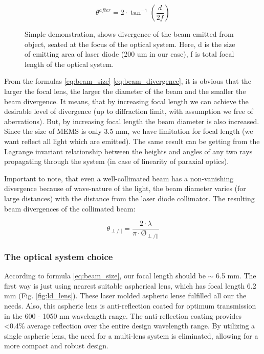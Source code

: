 \begin{figure}[H]
\begin{minipage}[h]{0.52\linewidth}
\end{minipage}
\hfill
\begin{minipage}[h]{0.45\linewidth}
\begin{equation}\label{eq:beam_divergence}
\theta^{after} = 2 \cdot \tan^{-1}{(\frac{d}{2f})}
\end{equation}
\end{minipage}
\caption{
Simple demonstration, shows divergence of the beam emitted from object, seated at the focus of the optical system. Here, d is the size of emitting area of laser diode (200 um in our case), f is total focal length of the optical system.
}
\label{fig:lens}
\end{figure}





From the formulas \ref{eq:beam_size} \ref{eq:beam_divergence}, it is obvious that the larger the focal lens, the larger the diameter of the beam and the smaller the beam divergence. It means, that by increasing focal length we can achieve the desirable level of divergence (up to diffraction limit, with assumption we free of aberrations). But, by increasing focal length the beam diameter is also increased.
Since the size of MEMS is only 3.5 mm, we have limitation for focal length (we want reflect all light which are emitted).
The same result can be getting from the Lagrange invariant relationship between the heights and angles of any two rays propagating through the system (in case of linearity of paraxial optics).

Important to note, that even a well-collimated beam has a non-vanishing divergence because of wave-nature of the light, the beam diameter varies (for large distances) with the distance from the laser diode collimator. The resulting beam divergences of the collimated beam:



\begin{equation}\label{eq:beam_divergence}
\theta_{\perp/||} = \frac{2\cdot \lambda}{\pi \cdot \text{\O}_{\perp/||}}
\end{equation}

\subsubsection{The optical system choice}
According to formula \ref{eq:beam_size}, our focal length should be $\sim$ 6.5 mm.
The first way is just using nearest suitable aspherical lens, which has focal length 6.2 mm (Fig. \ref{fig:ld_lens}).
These laser molded aspheric lense fulfilled all our the needs. Also, this aspheric lens is anti-reflection coated for optimum transmission in the 600 - 1050 nm wavelength range. The anti-reflection coating provides <0.4\% average reflection over the entire design wavelength range. By utilizing a single aspheric lens, the need for a multi-lens system is eliminated, allowing for a more compact and robust design. 


